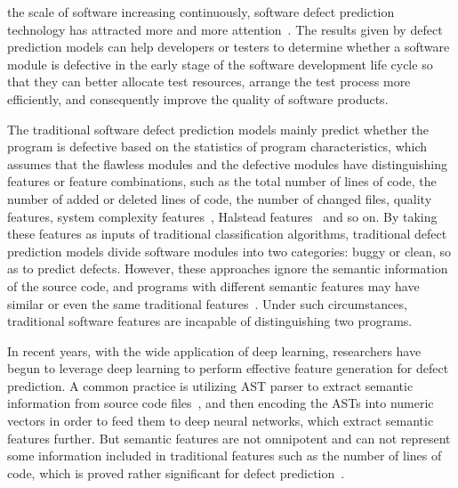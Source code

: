 \documentclass[journal]{IEEEtran}
\begin{document}
 the scale of software increasing continuously, software defect prediction technology has attracted more and more attention~\cite{catal2009systematic,jiang2013personalized,nam2014survey}. The results given by defect prediction models can help developers or testers to determine whether a software module is defective in the early stage of the software development life cycle so that they can better allocate test resources, arrange the test process more efficiently, and consequently improve the quality of software products.


The traditional software defect prediction models mainly predict whether the program is defective based on the statistics of program characteristics, which assumes that the flawless modules and the defective modules have distinguishing features or feature combinations, such as the total number of lines of code, the number of added or deleted lines of code, the number of changed files, quality features, system complexity features~\cite{maurice1977elements}, Halstead features~\cite{mccabe1976complexity} and so on. By taking these features as inputs of traditional classification algorithms, traditional defect prediction models divide software modules into two categories: buggy or clean, so as to predict defects. However, these approaches ignore the semantic information of the source code, and programs with different semantic features may have similar or even the same traditional features~\cite{wang2018deep}. Under such circumstances, traditional software features are incapable of distinguishing two programs.


In recent years, with the wide application of deep learning, researchers have begun to leverage deep learning to perform effective feature generation for defect prediction. A common practice is utilizing AST parser to extract semantic information from source code files~\cite{wang2018deep}, and then encoding the ASTs into numeric vectors in order to feed them to deep neural networks, which extract semantic features further. But semantic features are not omnipotent and can not represent some information included in traditional features such as the number of lines of code, which is proved rather significant for defect prediction~\cite{zhou2018far}.


\end{document}
